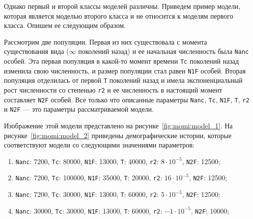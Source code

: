 \documentclass[a4paper,14pt,oneside,openany,article]{memoir}
\begin{document}
Однако первый и второй классы моделей различны.
Приведем пример модели, которая является моделью второго класса и не относится к моделям первого класса.
Опишем ее следующим образом.

Рассмотрим две популяции.
Первая из них существовала с момента существования вида ($\infty$ поколений назад) и ее начальная численность была \texttt{Nanc} особей.
Эта первая популяция в какой-то момент времени \texttt{Tc} поколений назад изменила свою численность, и размер популяции стал равен \texttt{N1F} особей.
Вторая популяция отделилась от первой \texttt{T} поколений назад и имела экспоненциальный рост численности со степенью \texttt{r2} и ее численность в настоящий момент составляет \texttt{N2F} особей.
Все только что описанные параметры \texttt{Nanc}, \texttt{Tc}, \texttt{N1F}, \texttt{T}, \texttt{r2} и \texttt{N2F} --- это параметры рассматриваемой модели.

Изображение этой модели представлено на рисунке~\ref{fig:momi:model_1}.
На рисунке~\ref{fig:momi:model_2} приведены демографические истории, которые соответствуют модели со следующими значениями параметров:
\begin{enumerate}[label={\arabic*}.]
    \item \texttt{Nanc}: 7200, \texttt{Tc}: 80000, \texttt{N1F}: 13000, \texttt{T}: 40000, \texttt{r2}: $8\cdot 10^{-5}$, \texttt{N2F}: 12500;
    \item \texttt{Nanc}: 7200, \texttt{Tc}: 100000, \texttt{N1F}: 35000, \texttt{T}: 20000, \texttt{r2}: $16\cdot 10^{-5}$, \texttt{N2F}: 12500;
    \item \texttt{Nanc}: 7200, \texttt{Tc}: 30000, \texttt{N1F}: 13000, \texttt{T}: 60000, \texttt{r2}: $5\cdot 10^{-5}$, \texttt{N2F}: 12500;
    \item \texttt{Nanc}: 30000, \texttt{Tc}: 30000, \texttt{N1F}: 13000, \texttt{T}: 60000, \texttt{r2}: $-1\cdot 10^{-5}$, \texttt{N2F}: 10000;
\end{enumerate}
\end{document}
